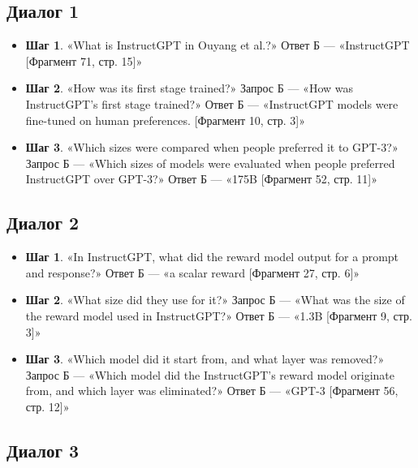 \documentclass[12pt,a4paper]{article}
\providecommand{\tightlist}{\setlength{\itemsep}{0pt}\setlength{\parskip}{0pt}}
\begin{document}
\hypertarget{ux434ux438ux430ux43bux43eux433-1}{%
\subsection{Диалог 1}\label{ux434ux438ux430ux43bux43eux433-1}}

\begin{itemize}
\tightlist
\item
  \textbf{Шаг 1}. «What is InstructGPT in Ouyang et al.?» Ответ Б ---
  «InstructGPT {[}Фрагмент 71, стр. 15{]}»
\item
  \textbf{Шаг 2}. «How was its first stage trained?» Запрос Б --- «How
  was InstructGPT's first stage trained?» Ответ Б --- «InstructGPT
  models were fine-tuned on human preferences. {[}Фрагмент 10, стр.
  3{]}»
\item
  \textbf{Шаг 3}. «Which sizes were compared when people preferred it to
  GPT-3?» Запрос Б --- «Which sizes of models were evaluated when people
  preferred InstructGPT over GPT-3?» Ответ Б --- «175B {[}Фрагмент 52,
  стр. 11{]}»
\end{itemize}

\hypertarget{ux434ux438ux430ux43bux43eux433-2}{%
\subsection{Диалог 2}\label{ux434ux438ux430ux43bux43eux433-2}}

\begin{itemize}
\tightlist
\item
  \textbf{Шаг 1}. «In InstructGPT, what did the reward model output for
  a prompt and response?» Ответ Б --- «a scalar reward {[}Фрагмент 27,
  стр. 6{]}»
\item
  \textbf{Шаг 2}. «What size did they use for it?» Запрос Б --- «What
  was the size of the reward model used in InstructGPT?» Ответ Б ---
  «1.3B {[}Фрагмент 9, стр. 3{]}»
\item
  \textbf{Шаг 3}. «Which model did it start from, and what layer was
  removed?» Запрос Б --- «Which model did the InstructGPT's reward model
  originate from, and which layer was eliminated?» Ответ Б --- «GPT-3
  {[}Фрагмент 56, стр. 12{]}»
\end{itemize}

\hypertarget{ux434ux438ux430ux43bux43eux433-3}{%
\subsection{Диалог 3}\label{ux434ux438ux430ux43bux43eux433-3}}
\end{document}
